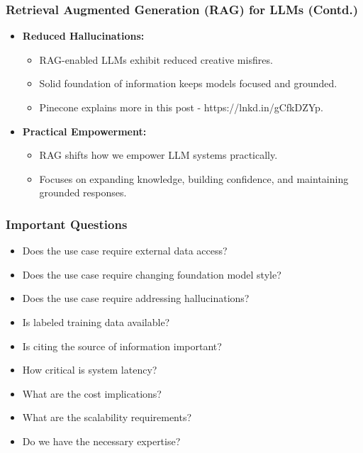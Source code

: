 \begin{frame}[fragile]\frametitle{Retrieval Augmented Generation (RAG) for LLMs (Contd.)}

\begin{itemize}
  \item \textbf{Reduced Hallucinations:}
    \begin{itemize}
      \item RAG-enabled LLMs exhibit reduced creative misfires.
      \item Solid foundation of information keeps models focused and grounded.
      \item Pinecone explains more in this post - https://lnkd.in/gCfkDZYp.
    \end{itemize}

  \item \textbf{Practical Empowerment:}
    \begin{itemize}
      \item RAG shifts how we empower LLM systems practically.
      \item Focuses on expanding knowledge, building confidence, and maintaining grounded responses.
    \end{itemize}
\end{itemize}

\end{frame}



\begin{frame}[fragile]\frametitle{Important Questions}
\begin{itemize}
  \item Does the use case require external data access?
  \item Does the use case require changing foundation model style?
  \item Does the use case require addressing hallucinations?
  \item Is labeled training data available?
  \item Is citing the source of information important?
  \item How critical is system latency?
  \item What are the cost implications?
  \item What are the scalability requirements?
  \item Do we have the necessary expertise?
\end{itemize}
\end{frame}




